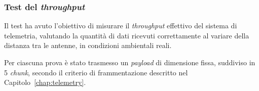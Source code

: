 \documentclass[12pt,a4paper,twoside]{book}
\begin{document}
    \begin{table}[H]
        \centering
        \caption{Condizioni del test del throughput.}
        \label{tab:T1-conditions-pdf}
    \end{table}
\fi

\subsubsection{Test del \emph{throughput}}

Il test ha avuto l’obiettivo di misurare il \emph{throughput} effettivo del
sistema di telemetria, valutando la quantità di dati ricevuti correttamente al
variare della distanza tra le antenne, in condizioni ambientali reali.

Per ciascuna prova è stato trasmesso un \emph{payload} di dimensione fissa,
suddiviso in 5 \emph{chunk}, secondo il criterio di frammentazione descritto nel
Capitolo~\ref{chap:telemetry}.
\end{document}
